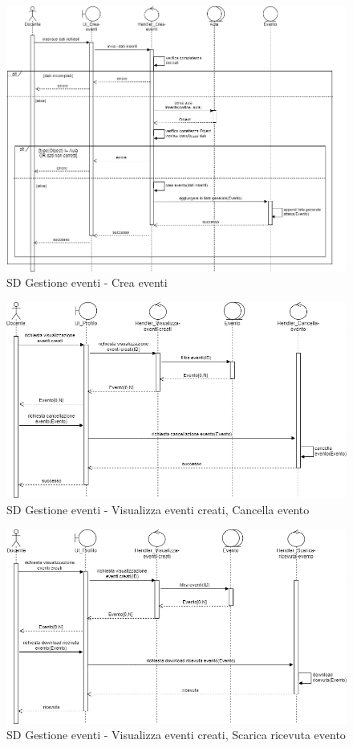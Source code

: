 \documentclass[11pt]{article}
\begin{document}
\begin{figure}[H]
\centering
\includegraphics[width=1\textwidth]{SD Gestione eventi - Crea evento.png}
\caption{SD Gestione eventi - Crea eventi}
\end{figure}

\begin{figure}[H]
\centering
\includegraphics[width=1\textwidth]{SD Gestione eventi - Cancella evento.png}
\caption{SD Gestione eventi - Visualizza eventi creati, Cancella evento}
\end{figure}

\begin{figure}[H]
\centering
\includegraphics[width=1\textwidth]{SD Gestione eventi - Scarica ricevuta evento creato.png}
\caption{SD Gestione eventi - Visualizza eventi creati, Scarica ricevuta evento}
\end{figure}
\end{document}
